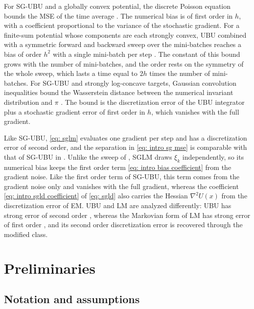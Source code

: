 \documentclass{article}
\numberwithin{equation}{section}
\begin{document}
For SG-UBU and a globally convex potential, the discrete Poisson equation bounds the MSE of the time average \citep{lu2025mse}. The numerical bias is of first order in $h$, with a coefficient proportional to the variance of the stochastic gradient. For a finite-sum potential whose components are each strongly convex, UBU combined with a symmetric forward and backward sweep over the mini-batches reaches a bias of order $h^2$ with a single mini-batch per step \citep{paulin2025sampling}. The constant of this bound grows with the number of mini-batches, and the order rests on the symmetry of the whole sweep, which lasts a time equal to $2h$ times the number of mini-batches. For SG-UBU and strongly log-concave targets, Gaussian convolution inequalities bound the Wasserstein distance between the numerical invariant distribution and $\pi$ \citep{paulin2026theoretical}. The bound is the discretization error of the UBU integrator plus a stochastic gradient error of first order in $h$, which vanishes with the full gradient.

Like SG-UBU, \eqref{eq: sglm} evaluates one gradient per step and has a discretization error of second order, and the separation in \eqref{eq: intro sg mse} is comparable with that of SG-UBU in \citep{lu2025mse}. Unlike the sweep of \citep{paulin2025sampling}, SGLM draws $\xi_k$ independently, so its numerical bias keeps the first order term \eqref{eq: intro bias coefficient} from the gradient noise. Like the first order term of SG-UBU, this term comes from the gradient noise only and vanishes with the full gradient, whereas the coefficient \eqref{eq: intro sgld coefficient} of \eqref{eq: sgld} also carries the Hessian $\nabla^2 U(x)$ from the discretization error of EM. UBU and LM are analyzed differently: UBU has strong error of second order \citep{sanz2021wasserstein, paulin2024correction}, whereas the Markovian form of LM has strong error of first order \citep{ye2026mse}, and its second order discretization error is recovered through the modified class.

\section{Preliminaries}
\label{sec: preliminaries}

\subsection{Notation and assumptions}
\label{subsec: notation}
\end{document}
